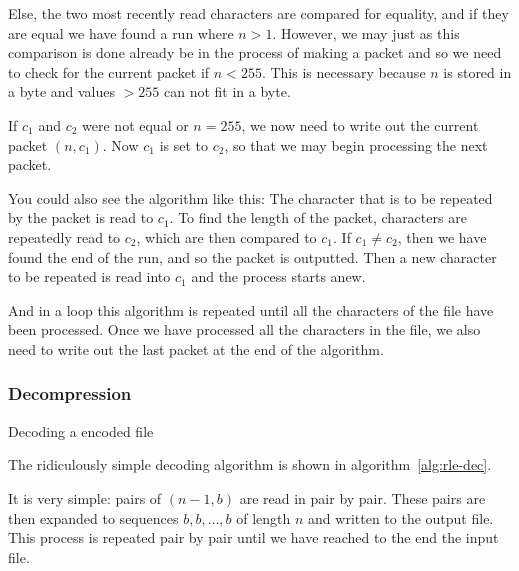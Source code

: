 Else, the two most recently read characters are compared for equality,
and if they are equal we have found a run where $n > 1$. However, we
may just as this comparison is done already be in the process of
making a packet and so we need to check for the current packet if $n <
255$. This is necessary because $n$ is stored in a byte and values $>
255$ can not fit in a byte.

If $c_1$ and $c_2$ were not equal or $n = 255$, we now need to write
out the current packet $(n,c_1)$. Now $c_1$ is set to $c_2$, so that
we may begin processing the next packet.

You could also see the algorithm like this: The character that is to
be repeated by the packet is read to $c_1$. To find the length of the
packet, characters are repeatedly read to $c_2$, which are then
compared to $c_1$. If $c_1 \neq c_2$, then we have found the end of
the run, and so the packet is outputted. Then a new character to be
repeated is read into $c_1$ and the process starts anew.

And in a loop this algorithm is repeated until all the characters of
the file have been processed. Once we have processed all the
characters in the file, we also need to write out the last packet at
the end of the algorithm.

\subsubsection{Decompression}

\begin{algorithm}
  \caption{Decoding a \rle encoded file}
  \label{alg:rle-dec}
  \begin{algorithmic}[1]


    \While{\neof}
    \State {}
    \EndRepeatn


    \EndWhile
  \end{algorithmic}
\end{algorithm}

The ridiculously simple \rle decoding algorithm is shown in
algorithm~\ref{alg:rle-dec}.

It is very simple: pairs of $(n-1,b)$ are read in pair by pair. These
pairs are then expanded to sequences $b,b,\dots,b$ of length $n$ and
written to the output file. This process is repeated pair by pair
until we have reached to the end the input file.

